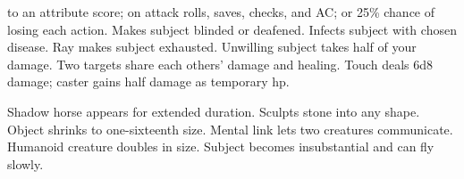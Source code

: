 \begin{swspelllist}
  to an attribute score;  on attack rolls, saves, checks, and AC; or 25\% chance of losing each action.
 Makes subject blinded or deafened.
 Infects subject with chosen disease.
 Ray makes subject exhausted.
 Unwilling subject takes half of your damage.
 Two targets share each others' damage and healing.
 Touch deals 6d8 damage; caster gains half damage as temporary hp.

 Shadow horse appears for extended duration.
 Sculpts stone into any shape.
 Object shrinks to one-sixteenth size.
 Mental link lets two creatures communicate.
 Humanoid creature doubles in size.
 Subject becomes insubstantial and can fly slowly.
\end{swspelllist}

